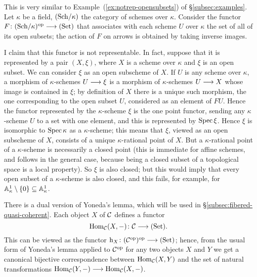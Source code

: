 \begin{2   CONTRAVARIANT FUNCTORS}
\begin{2.1 Yoneda Lemma}
\begin{example} This is very similar to
Example~(\ref{ex:notrep-opensubsets}) of \S\ref{subsec:examples}. Let
$\kappa$ be a field, $\catsch{\kappa}$ the category of schemes over
$\kappa$. Consider the functor $F \colon \catsch{\kappa}\op \arr \catset$
that associates with each scheme $U$ over $\kappa$ the set of all of its
open subsets; the action of $F$ on arrows is obtained by taking inverse
images. 

I claim that this functor is not representable. In fact, suppose that it is represented by a pair $(X, \xi)$, where $X$ is a scheme over $\kappa$ and $\xi$ is an open subset. We can consider $\xi$ as an open subscheme of $X$. If $U$ is any scheme over $\kappa$, a morphism of $\kappa$-schemes $U \arr \xi$ is a  morphism of $\kappa$-schemes $U \arr X$ whose image is contained in $\xi$; by definition of $X$ there is a unique such morphism, the one corresponding to the open subset $U$, considered as an element of $FU$. Hence the functor represented by the $\kappa$-scheme $\xi$ is the one point functor, sending any $\kappa$-scheme $U$ to a set with one element, and this is represented by $\spec \xi$. Hence $\xi$ is isomorphic to $\spec \kappa$ as a $\kappa$-scheme; this means that $\xi$, viewed as an open subscheme of $X$, consists of a unique $\kappa$-rational point of $X$. But a $\kappa$-rational point of a $\kappa$-scheme is necessarily a closed point (this is immediate for affine schemes, and follows in the general case, because being a closed subset of a topological space is a local property). So $\xi$ is also closed; but this would imply that every open subset of a $\kappa$-scheme is also closed, and this fails, for example, for $\AA^1_{\kappa}
\setminus \{0\} \subseteq \AA^1_\kappa$.
\end{example}

\begin{remark}\label{rmk:dual-Yoneda}
There is a dual version of Yoneda's lemma, which will be used in  \S\ref{subsec:fibered-quasi-coherent}. Each object $X$ of $\cC$ defines a functor
   \[
   \hom_{\cC}(X,-) \colon \cC \arr \catset.
   \]
This can be viewed as the functor $\h_X \colon (\cC\op)\op \arr \catset$; hence, from the usual form of Yoneda's lemma applied to $\cC\op$ for any two objects $X$ and $Y$ we get a canonical bijective correspondence between $\hom_{\cC}(X,Y)$ and the set of natural transformations $\hom_{\cC}(Y,-) \arr \hom_{\cC}(X,-)$.
\end{remark}



\end{2.1 Yoneda Lemma}
\end{2   CONTRAVARIANT FUNCTORS}
